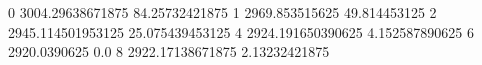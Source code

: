 0 3004.29638671875 84.25732421875
1 2969.853515625 49.814453125
2 2945.114501953125 25.075439453125
4 2924.191650390625 4.152587890625
6 2920.0390625 0.0
8 2922.17138671875 2.13232421875
